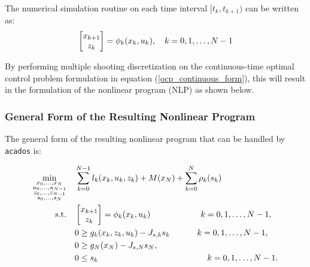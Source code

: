 \documentclass{thesisreport}
\begin{document}
The numerical simulation routine on each time interval $[t_k, t_{k+1})$ can be written as:
    $$ \begin{bmatrix}
        x_{k+1}\\
        z_k\\
    \end{bmatrix} = \phi_k(x_k, u_k), \text{\space \space \space} k=0,1, \ldots, N-1$$   
 
By performing multiple shooting discretization on the continuous-time optimal control problem formulation in equation (\ref{ocp_continuous_form}), this will result in the formulation of the nonlinear program (NLP) as shown below.

\newpage

\subsubsection{General Form of the Resulting Nonlinear Program}

The general form of the resulting nonlinear program that can be handled by \texttt{acados} is:

    \begin{equation}\label{NLP}
        \begin{aligned}
        \min_{\substack{x_0,\ldots,x_N\\ u_0,\ldots, u_{N-1} \\ z_0,\ldots, z_{N-1}\\  s_0, \ldots, s_N}} \quad & \sum_{k=0}^{N-1}{l_k(x_k, u_k, z_k) + M(x_N) + \sum_{k=0}^N \rho_k(s_k)}\\
        \textrm{s.t.} \quad & \begin{bmatrix}
                                x_{k+1}\\
                                z_k\\
                                \end{bmatrix} = \phi_k(x_k, u_k) \text{ \hspace{2cm}} k=0,1, \ldots, N-1, \\
                            & 0 \geq g_k(x_k, z_k, u_k) - J_{s,k}s_k \text{\hspace{1.15cm}} k=0,1, \ldots, N-1, \\
                            & 0 \geq g_N(x_N) - J_{s,N}s_N, \\
                            & 0 \leq s_k \text{\hspace{4.6cm}} k=0,1, \ldots, N-1.
        \end{aligned}
    \end{equation}
    
\end{document}
